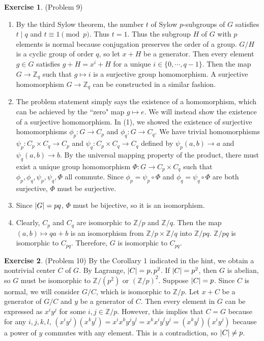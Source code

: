 \documentclass[12pt, psamsfonts]{amsart}
\theoremstyle{definition}
\newtheorem*{exer}{Exercise}
\theoremstyle{remark}
\numberwithin{equation}{section}
\begin{document}
\begin{exer}{(Problem 9)}
  \begin{enumerate}
    \item
      By the third Sylow theorem, the number $t$ of Sylow $p$-subgroups of $G$ satisfies $t \mid q$ and $t \equiv 1 \pmod p$.
      Thus $t = 1$.
      Thus the subgroup $H$ of $G$ with $p$ elements is normal because conjugation preserves the order of a group.
      $G / H$ is a cyclic group of order $q$, so let $x + H$ be a generator.
      Then every element $g \in G$ satisfies $g + H = x^i + H$ for a unique $i \in \{ 0, \cdots, q - 1 \}$.
      Then the map $G \rightarrow \mathbb{Z}_{q}$ such that $g \mapsto i$ is a surjective group homomorphism.
      A surjective homomorphism $G \rightarrow \mathbb{Z}_q$ can be constructed in a similar fashion.
    \item
      The problem statement simply says the existence of a homomorphism, which can be achieved by the ``zero" map $g \mapsto e$.
      We will instead show the existence of a surjective homomorphism.
      In (1), we showed the existence of surjective homomorphisms $\phi_p: G \rightarrow C_p$ and $\phi_q: G \rightarrow C_q$.
      We have trivial homomorphisms $\psi_p: C_p \times C_q \rightarrow C_p$ and $\psi_q: C_p \times C_q \rightarrow C_q$ defined by $\psi_p(a, b) \rightarrow a$ and $\psi_q(a, b) \rightarrow b$.
      By the universal mapping property of the product, there must exist a unique group homomorphism $\Phi: G \rightarrow C_p \times C_q$ such that $\phi_p, \phi_q, \psi_p, \psi_q, \Phi$ all commute.
      Since $\phi_p = \psi_p \circ \Phi$ and $\phi_q = \psi_q \circ \Phi$ are both surjective, $\Phi$ must be surjective.
    \item
      Since $\abs{G} = pq$, $\Phi$ must be bijective, so it is an isomorphism.
    \item
      Clearly, $C_p$ and $C_q$ are isomorphic to $\mathbb{Z}/p$ and $\mathbb{Z}/q$.
      Then the map $(a, b) \mapsto qa + b$ is an isomorphism from $\mathbb{Z}/p \times \mathbb{Z}/q$ into $\mathbb{Z}/pq$.
      $\mathbb{Z}/pq$ is isomorphic to $C_{pq}$.
      Therefore, $G$ is isomorphic to $C_{pq}$.
  \end{enumerate}
\end{exer}

\begin{exer}{(Problem 10)}
  By the Corollary 1 indicated in the hint, we obtain a nontrivial center $C$ of $G$.
  By Lagrange, $\abs{C} = p, p^2$.
  If $\abs{C} = p^2$, then $G$ is abelian, so $G$ must be isomorphic to $\mathbb{Z} / (p^2)$ or $(\mathbb{Z} / p)^2$.
  Suppose $\abs{C} = p$.
  Since $C$ is normal, we will consider $G / C$, which is isomorphic to $\mathbb{Z} / p$.
  Let $x + C$ be a generator of $G / C$ and $y$ be a generator of $C$.
  Then every element in $G$ can be expressed as $x^iy^j$ for some $i, j \in \mathbb{Z}/p$.
  However, this implies that $C = G$ because for any $i, j, k, l$, $(x^iy^j)(x^ky^l) = x^ix^ky^jy^l = x^kx^iy^ly^j = (x^ky^l)(x^iy^j)$ because a power of $y$ commutes with any element.
  This is a contradiction, so $\abs{C} \ne p$.
\end{exer}
\end{document}
